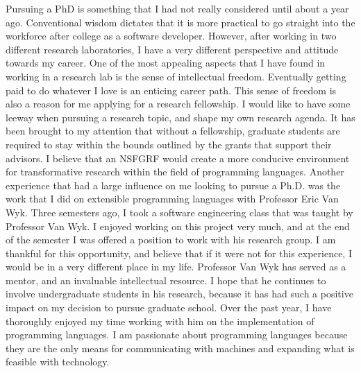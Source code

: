 \documentclass[a4paper,12pt]{article}
\newcommand{\tab}{\hspace*{2em}}
\begin{document}
\tab Pursuing a PhD is something that I had not really considered until about a year ago. Conventional wisdom dictates that it is  more practical to go straight into the workforce after college as a software developer. However, after working in two different research laboratories, I have a very different perspective and attitude towards my career. One of the most appealing aspects that I have found in working in a research lab is the sense of intellectual freedom.  Eventually getting paid to do whatever I love is an enticing career path. This sense of freedom is also a reason for me applying for a research fellowship. I would like to have some leeway when pursuing a research topic, and shape my own research agenda. It has been brought to my attention that without a fellowship, graduate students are required to stay within the bounds outlined by the grants that support their advisors. I believe that an NSFGRF would create a more conducive environment for transformative research within the field of programming languages.
\newline
\tab Another experience that had a large influence on me looking to pursue a Ph.D. was the work that I did on extensible programming languages with Professor Eric Van Wyk. Three semesters ago, I took a software engineering class that was taught by Professor Van Wyk. I enjoyed working on this project very much, and at the end of the semester I was offered a position to work with his research group. I am thankful for this opportunity, and believe that if it were not for this experience, I would be in a very different place in my life. Professor Van Wyk has served as a mentor, and an invaluable intellectual resource. I hope that he continues to involve undergraduate students in his research, because it has had such a positive impact on my decision to pursue graduate school. Over the past year, I have thoroughly enjoyed my time working with him on the implementation of programming languages. I am passionate about programming languages because they are the only means for communicating with machines and expanding what is feasible with technology. 
\newline
\end{document}
